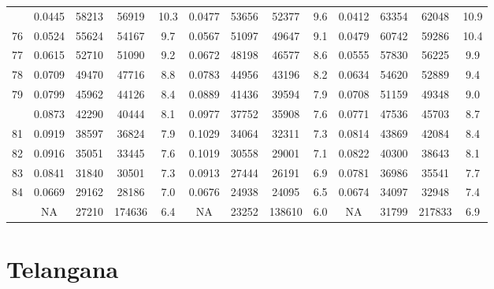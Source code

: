 \documentclass[
  14pt,
]{article}
\begin{document}
\begin{longtable}[t]{lcccccccccccc}
\addlinespace
75 & 0.0445 & 58213 & 56919 & 10.3 & 0.0477 & 53656 & 52377 & 9.6 & 0.0412 & 63354 & 62048 & 10.9\\
76 & 0.0524 & 55624 & 54167 & 9.7 & 0.0567 & 51097 & 49647 & 9.1 & 0.0479 & 60742 & 59286 & 10.4\\
77 & 0.0615 & 52710 & 51090 & 9.2 & 0.0672 & 48198 & 46577 & 8.6 & 0.0555 & 57830 & 56225 & 9.9\\
78 & 0.0709 & 49470 & 47716 & 8.8 & 0.0783 & 44956 & 43196 & 8.2 & 0.0634 & 54620 & 52889 & 9.4\\
79 & 0.0799 & 45962 & 44126 & 8.4 & 0.0889 & 41436 & 39594 & 7.9 & 0.0708 & 51159 & 49348 & 9.0\\
\addlinespace
80 & 0.0873 & 42290 & 40444 & 8.1 & 0.0977 & 37752 & 35908 & 7.6 & 0.0771 & 47536 & 45703 & 8.7\\
81 & 0.0919 & 38597 & 36824 & 7.9 & 0.1029 & 34064 & 32311 & 7.3 & 0.0814 & 43869 & 42084 & 8.4\\
82 & 0.0916 & 35051 & 33445 & 7.6 & 0.1019 & 30558 & 29001 & 7.1 & 0.0822 & 40300 & 38643 & 8.1\\
83 & 0.0841 & 31840 & 30501 & 7.3 & 0.0913 & 27444 & 26191 & 6.9 & 0.0781 & 36986 & 35541 & 7.7\\
84 & 0.0669 & 29162 & 28186 & 7.0 & 0.0676 & 24938 & 24095 & 6.5 & 0.0674 & 34097 & 32948 & 7.4\\
\addlinespace
85 & NA & 27210 & 174636 & 6.4 & NA & 23252 & 138610 & 6.0 & NA & 31799 & 217833 & 6.9\\*
\end{longtable}

\pagebreak

\hypertarget{telangana}{%
\section{Telangana}\label{telangana}}
\end{document}

